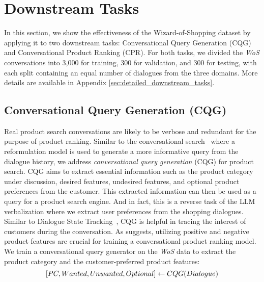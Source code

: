 \section{Downstream Tasks}
\label{sec:downstream_tasks}
In this section, we show the effectiveness of the Wizard-of-Shopping dataset by applying it to two downstream tasks: Conversational Query Generation (CQG) and Conversational Product Ranking (CPR). For both tasks, we divided the \textit{WoS} conversations into 3,000 for training, 300 for validation, and 300 for testing, with each split containing an equal number of dialogues from the three domains. More details are available in Appendix \ref{sec:detailed_downstream_tasks}.

\subsection{Conversational Query Generation (CQG)}

Real product search conversations are likely to be verbose and redundant for the purpose of product ranking.  
Similar to the conversational search~\cite{yu2020few,vakulenko2021question,chen-etal-2022-reinforced,wu2022conqrr} where a reformulation model is used to generate a more informative query from the dialogue history, we address \textit{conversational query generation} (CQG) for product search. 
CQG aims to extract essential information such as the product category under discussion, desired features, undesired features, and optional product preferences from the customer. This extracted information can then be used as a query for a product search engine. And in fact, this is a reverse task of the LLM verbalization where we extract user preferences from the shopping dialogues. Similar to Dialogue State Tracking~\cite{lu2023dialgen}, CQG is helpful in tracing the interest of customers during the conversation. 
As \citet{bi2019conversational} suggests, utilizing positive and negative product features are crucial for training a conversational product ranking model. We train a conversational query generator on the \textit{WoS} data to extract the product category and the customer-preferred product features:
\begin{equation}\label{eq:cqg}  \small
    [PC, Wanted, Unwanted, Optional] \gets CQG(Dialogue)
\end{equation}
\vspace{-2em}



